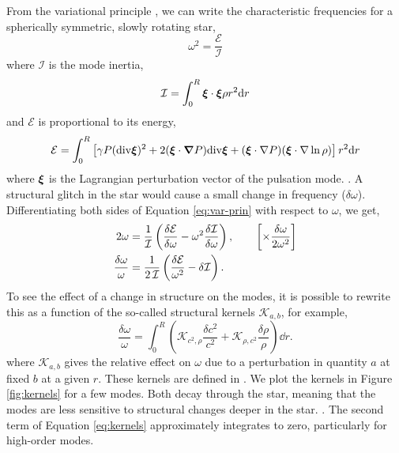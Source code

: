 From the variational principle \citep{Chandrasekhar1939,Chandrasekhar1964}, we can write the characteristic frequencies for a spherically symmetric, slowly rotating star,
%
\begin{equation}
    \omega^2 = \frac{\mathcal{E}}{\mathcal{I}}\label{eq:var-prin}
\end{equation}
%
where \(\mathcal{I}\) is the mode inertia,
%
\begin{equation}
    \mathcal{I} = \int_0^R \bm{\xi} \cdot \bm{\xi} \rho r^2 \mathrm{d} r
\end{equation}
%
and \(\mathcal{E}\) is proportional to its energy,
%
\begin{equation}
    \mathcal{E} = \int_0^R \left[\gamma P (\mathrm{div} \bm{\xi})^2 + 2(\bm{\xi}\cdot\bm{\nabla} P) \mathrm{div} \bm{\xi} + (\bm{\xi}\cdot \nabla P) (\bm{\xi}\cdot\nabla\ln\rho)\right] r^2 \mathrm{d} r
\end{equation}
%
where \(\bm{\xi}\) is the Lagrangian perturbation vector of the pulsation mode. . A structural glitch in the star would cause a small change in frequency (\(\delta\omega\)). Differentiating both sides of Equation \ref{eq:var-prin} with respect to \(\omega\), we get,
%
\begin{align}
    2\omega &= \frac{1}{\mathcal{I}} \left( \frac{\delta\mathcal{E}}{\delta\omega} - \omega^2 \frac{\delta\mathcal{I}}{\delta\omega}\right), \qquad \left[\times \frac{\delta\omega}{2\omega^2}\right] \notag \\
    \frac{\delta\omega}{\omega} &= \frac{1}{2\,\mathcal{I}} \left(\frac{\delta\mathcal{E}}{\omega^2} - \delta\mathcal{I}\right).
\end{align}
%
To see the effect of a change in structure on the modes, it is possible to rewrite this as a function of the so-called structural kernels \(\mathcal{K}_{a,b}\), for example,
%
\begin{equation}
    \frac{\delta\omega}{\omega} = \int_0^R \left(\mathcal{K}_{c^2,\rho} \frac{\delta c^2}{c^2} + \mathcal{K}_{\rho,c^2} \frac{\delta \rho}{\rho} \right) \dd r.\label{eq:kernels}
\end{equation}
%
where \(\mathcal{K}_{a, b}\) gives the relative effect on \(\omega\) due to a perturbation in quantity \(a\) at fixed \(b\) at a given \(r\). These kernels are defined in \citet{Gough.Thompson1991}. We plot the kernels in Figure \ref{fig:kernels} for a few modes. Both decay through the star, meaning that the modes are less sensitive to structural changes deeper in the star. . The second term of Equation \ref{eq:kernels} approximately integrates to zero, particularly for high-order modes. 

